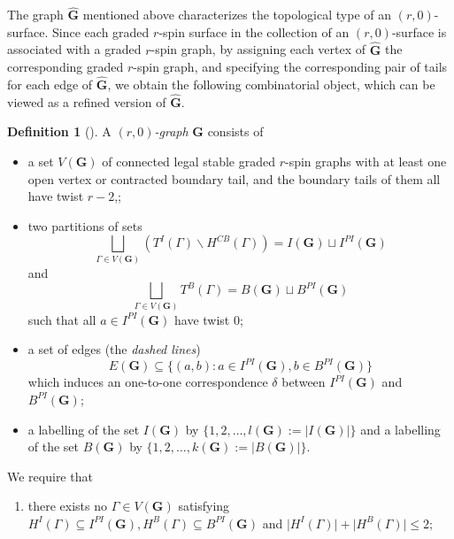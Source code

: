 \documentclass[11pt]{amsart}
\theoremstyle{definition}
\newtheorem{dfn}[dummy]{Definition}
\theoremstyle{remark}
\newcommand{\<}{\left<}
\renewcommand{\>}{\right>}
\numberwithin{equation}{section}
\begin{document}
The graph $\hat{\mathbf{G}}$ mentioned above characterizes the topological type of an $(r,0)$-surface. Since each graded $r$-spin surface in the collection of an $(r,0)$-surface is associated with a graded $r$-spin graph, by assigning each vertex of $\hat{\mathbf{G}}$ the corresponding graded $r$-spin graph, and specifying the corresponding pair of tails for each edge of $\hat{\mathbf{G}}$, we obtain the following combinatorial object, which can be viewed as a refined version of $\hat{\mathbf{G}}$.
\begin{dfn}[{\cite[Definition 4.7]{TZ1}}]\label{def rh graphs}
A \textit{$(r,0)$-graph}  $\mathbf{G}$ consists of 
\begin{itemize} 
    \item a set $V(\mathbf{G})$ of connected legal stable graded $r$-spin graphs with at least one open vertex or contracted boundary tail, and the boundary tails of them all have twist %
$r-2$,;
    \item two %
partitions of sets
    $$
    \bigsqcup_{\Gamma\in V(\mathbf{G})}\left(T^I(\Gamma)\backslash H^{CB}(\Gamma)\right)=I(\mathbf{G})\sqcup I^{PI}(\mathbf{G})
    $$
    and
    $$
    \bigsqcup_{\Gamma\in V(\mathbf{G})}T^B(\Gamma)=B(\mathbf{G})\sqcup B^{PI}(\mathbf{G})
    $$
    such that all $a\in I^{PI}(\bm{G})$ have twist $0$;
    \item a set of edges (the \textit{dashed lines}) $$E(\mathbf{G})\subseteq \{(a,b)\colon a\in I^{PI}(\mathbf{G}),b\in B^{PI}(\mathbf{G})\}$$ which induces an one-to-one correspondence $\delta$ between $I^{PI}(\mathbf{G})$ and $B^{PI}(\mathbf{G})$;
    \item a labelling of the set $I(\mathbf{G})$ by $\{1,2,\dots,l(\mathbf{G}):=\lvert I(\mathbf{G})\rvert\}$ and a labelling of the set $B(\mathbf{G})$ by $\{1,2,\dots,k(\mathbf{G}):=\lvert B(\mathbf{G})\rvert\}$.
\end{itemize}
    We require that 
    \begin{enumerate}
        \item there exists no $\Gamma\in V(\mathbf{G})$ satisfying 
    $
    H^I(\Gamma)\subseteq I^{PI}(\mathbf{G}), H^B(\Gamma)\subseteq B^{PI}(\mathbf{G})$ 
and $
         \lvert H^I(\Gamma)\rvert+\lvert H^B(\Gamma)\rvert \le 2;
    $
    \end{enumerate}

\end{dfn}
\end{document}
